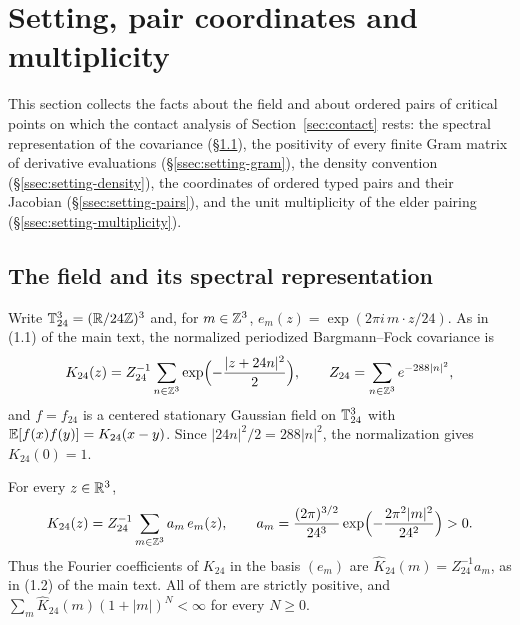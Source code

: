 \section{Setting, pair coordinates and multiplicity}\label{sec:setting}

This section collects the facts about the field and about ordered pairs of critical points on which the contact analysis of Section~\ref{sec:contact} rests: the spectral representation of the covariance (\S\ref{ssec:setting-field}), the positivity of every finite Gram matrix of derivative evaluations (\S\ref{ssec:setting-gram}), the density convention (\S\ref{ssec:setting-density}), the coordinates of ordered typed pairs and their Jacobian (\S\ref{ssec:setting-pairs}), and the unit multiplicity of the elder pairing (\S\ref{ssec:setting-multiplicity}).

\subsection{The field and its spectral representation}\label{ssec:setting-field}

Write $\mathbb T^3_{24}=(\mathbb R/24\mathbb Z)^3$ and, for $m\in\mathbb Z^3$, $e_m(z)=\exp(2\pi i\,m\cdot z/24)$. As in (1.1) of the main text, the normalized periodized Bargmann--Fock covariance is
\begin{equation}\label{eq:setting-K24}
K_{24}(z)=Z_{24}^{-1}\sum_{n\in\mathbb Z^3}\exp\Bigl(-\frac{|z+24n|^2}{2}\Bigr),\qquad Z_{24}=\sum_{n\in\mathbb Z^3}e^{-288|n|^2},
\end{equation}
and $f=f_{24}$ is a centered stationary Gaussian field on $\mathbb T^3_{24}$ with $\mathbb E[f(x)f(y)]=K_{24}(x-y)$. Since $|24n|^2/2=288|n|^2$, the normalization gives $K_{24}(0)=1$.

\begin{lemma}\label{lem:setting-spectral}
For every $z\in\mathbb R^3$,
\begin{equation}\label{eq:setting-spectral}
K_{24}(z)=Z_{24}^{-1}\sum_{m\in\mathbb Z^3}a_m\,e_m(z),\qquad a_m=\frac{(2\pi)^{3/2}}{24^3}\exp\Bigl(-\frac{2\pi^2|m|^2}{24^2}\Bigr)>0 .
\end{equation}
Thus the Fourier coefficients of $K_{24}$ in the basis $(e_m)$ are $\widehat K_{24}(m)=Z_{24}^{-1}a_m$, as in (1.2) of the main text. All of them are strictly positive, and $\sum_{m}\widehat K_{24}(m)(1+|m|)^N<\infty$ for every $N\ge0$.
\end{lemma}

